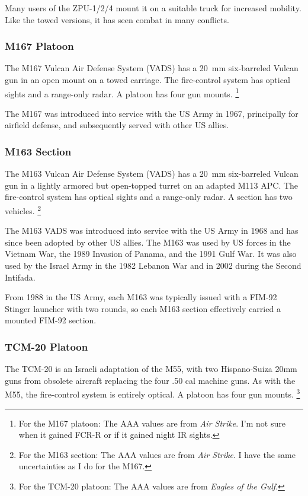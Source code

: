 \documentclass[10pt]{article}
\newcommand{\note}[1]{%
    \footnote{%
        \setlength{\parindent}{0pt}%
        \setlength{\parskip}{\smallskipamount}%
        #1
    }%
}
\begin{document}
Many users of the ZPU-1/2/4 mount it on a suitable truck for increased mobility. Like the towed versions, it has seen combat in many conflicts.

\subsubsection{M167 Platoon}

The M167 Vulcan Air Defense System (VADS) has a 20~mm six-barreled Vulcan gun in an open mount on a towed carriage. The fire-control system has optical sights and a range-only radar. A platoon has four gun mounts.%
\note{
    For the M167 platoon: The AAA values are from \emph{Air Strike}. I'm not sure when it gained FCR-R or if it gained night IR sights.
}

The M167 was introduced into service with the US Army in 1967, principally for airfield defense, and subsequently served with other US allies.

\subsubsection{M163 Section}

The M163 Vulcan Air Defense System (VADS) has a 20~mm six-barreled Vulcan gun in a lightly armored but open-topped turret on an adapted M113 APC. The fire-control system has optical sights and a range-only radar. A section has two vehicles.\note{
    For the M163 section: The AAA values are from \emph{Air Strike}. I have the same uncertainties as I do for the M167.
}

The M163 VADS was introduced into service with the US Army in 1968 and has since been adopted by other US allies. The M163 was used by US forces in the Vietnam War, the 1989 Invasion of Panama, and the 1991 Gulf War. It was also used by the Israel Army in the 1982 Lebanon War and in 2002 during the Second Intifada.

From 1988 in the US Army, each M163 was typically issued with a FIM-92 Stinger launcher with two rounds, so each M163 section effectively carried a mounted FIM-92 section.

\subsubsection{TCM-20 Platoon}

The TCM-20 is an Israeli adaptation of the M55, with two Hispano-Suiza 20mm guns from obsolete aircraft replacing the four .50 cal machine guns. As with the M55, the fire-control system is entirely optical. A platoon has four gun mounts.%
\note{
    For the TCM-20 platoon: The AAA values are from \emph{Eagles of the Gulf}.
}
\end{document}

